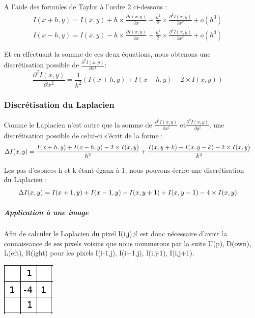 A l'aide des formules de Taylor à l'ordre 2 ci-dessous : 
\begin{equation*}
\begin{aligned}
    I(x+h,y) = I(x,y)+h\times \frac{\partial I(x,y)}{\partial x}+ \frac{h^2}{2} \times \frac{\partial ^2 I(x,y)}{\partial x^2} + o(h^3) \\
    I(x-h,y) =I(x,y)- h\times  \frac{\partial I(x,y)}{\partial x}+ \frac{h^2}{2} \times \frac{\partial^2 I(x,y)}{\partial x^2} + o(h^3)
\end{aligned}
\end{equation*}


Et en effectuant la somme de ces deux équations, nous obtenons une discrétisation possible de $\frac{\partial ^2 I(x,y)}{\partial x^2}$:  
\begin{equation*}
    \frac{\partial ^2 I(x,y)}{\partial x^2} =\frac{1}{h^2}\left( I(x+h,y) + I(x-h,y) - 2\times I(x,y)\right)
\end{equation*}

\subsubsection{Discrétisation du Laplacien}
Comme le Laplacien n'est autre que la somme de $\frac{\partial ^2 I(x,y)}{\partial x^2}$ et$\frac{\partial ^2 I(x,y)}{\partial y^2}$, une discrétisation possible de celui-ci s'écrit de la forme  : 
\begin{equation*}
    \Delta I(x,y) =  \frac{I(x+h,y) + I(x-h,y) - 2\times I(x,y)}{h^2}  + \frac{I(x,y+k) + I(x,y-k) - 2\times I(x,y)}{k^2} \\
\end{equation*}

Les pas d'espaces h et k étant égaux à 1, nous pouvons écrire une discrétisation du Laplacien  :
\begin{equation*}
     \Delta I(x,y) =  I(x+1,y) + I(x-1,y)+ I(x,y+1) + I(x,y-1) - 4\times I(x,y)  \\
\end{equation*}

\subparagraph{Application à une image }
Afin de calculer le Laplacien du pixel I(i,j),il est donc nécessaire d'avoir la connaissance de ses pixels voisins que nous nommerons par la suite U(p), D(own), L(eft), R(ight) pour les pixels I(i-1,j), I(i+1,j), I(i,j-1), I(i,j+1). 

\begin{center}
    \includegraphics[scale = 0.8]{Images/Laplacian.png}
\end{center}

